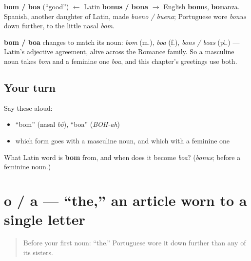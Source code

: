 \begin{cousinweb}
\textbf{bom / boa} (\textquotedblleft{}good\textquotedblright{}) $\leftarrow$ Latin \textbf{bonus / bona} $\to$ English \textbf{bon}us, \textbf{bon}anza. Spanish, another daughter of Latin, made \emph{bueno / buena}; Portuguese wore \emph{bonus} down further, to the little nasal \emph{bom}.
\end{cousinweb}

\begin{grammarlens}[title={Grammar Lens: it agrees with the noun}]
\textbf{bom / boa} changes to match its noun: \emph{bom} (m.), \emph{boa} (f.), \emph{bons / boas} (pl.) — Latin's adjective agreement, alive across the Romance family. So a masculine noun takes \emph{bom} and a feminine one \emph{boa}, and this chapter's greetings use both.
\end{grammarlens}

\subsection*{Your turn}
Say these aloud:

\begin{itemize}
\raggedright
  \item \textquotedblleft{}bom\textquotedblright{} (nasal \emph{bõ}), \textquotedblleft{}boa\textquotedblright{} (\emph{BOH-ah})
  \item which form goes with a masculine noun, and which with a feminine one
\end{itemize}

\begin{tcolorbox}[breakable,colback=teal!4,colframe=teal!35!black,title={Before you move on}]
What Latin word is \textbf{bom} from, and when does it become \emph{boa}? (\emph{bonus}; before a feminine noun.)
\end{tcolorbox}
\section[o / a]{o / a — \textquotedblleft{}the,\textquotedblright{} an article worn to a single letter}

\label{lesson:PT-C01-o-a}



\begin{quote}
Before your first noun: \textquotedblleft{}the.\textquotedblright{} Portuguese wore it down further than any of its sisters.
\end{quote}

